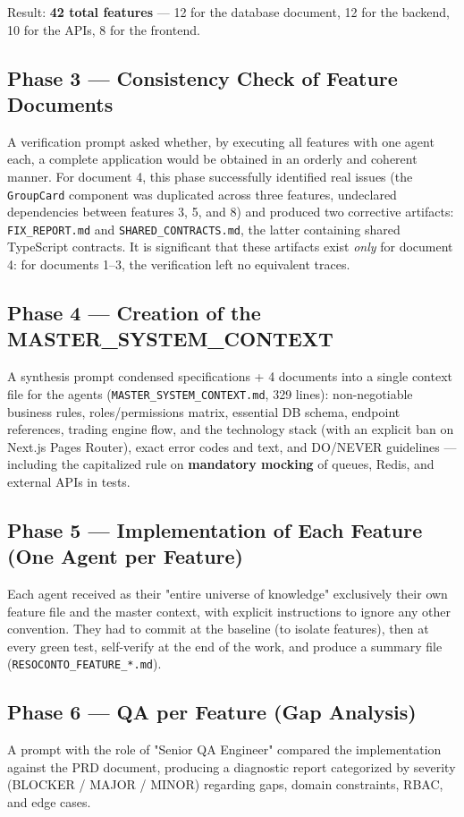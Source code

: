 \documentclass[11pt,a4paper]{article}
\newcommand{\file}[1]{\texttt{\small #1}}
\begin{document}
	Result: \textbf{42 total features} --- 12 for the database document, 12 for the backend, 10 for the APIs, 8 for the frontend.
	
	\subsection{Phase 3 --- Consistency Check of Feature Documents}
	A verification prompt asked whether, by executing all features with one agent each, a complete application would be obtained in an orderly and coherent manner. For document 4, this phase successfully identified real issues (the \file{GroupCard} component was duplicated across three features, undeclared dependencies between features 3, 5, and 8) and produced two corrective artifacts: \file{FIX\_REPORT.md} and \file{SHARED\_CONTRACTS.md}, the latter containing shared TypeScript contracts. It is significant that these artifacts exist \emph{only} for document 4: for documents 1--3, the verification left no equivalent traces.
	
	\subsection{Phase 4 --- Creation of the MASTER\_SYSTEM\_CONTEXT}
	A synthesis prompt condensed specifications + 4 documents into a single context file for the agents (\file{MASTER\_SYSTEM\_CONTEXT.md}, 329 lines): non-negotiable business rules, roles/permissions matrix, essential DB schema, endpoint references, trading engine flow, and the technology stack (with an explicit ban on Next.js Pages Router), exact error codes and text, and DO/NEVER guidelines --- including the capitalized rule on \textbf{mandatory mocking} of queues, Redis, and external APIs in tests.
	
	\subsection{Phase 5 --- Implementation of Each Feature (One Agent per Feature)}
	Each agent received as their "entire universe of knowledge" exclusively their own feature file and the master context, with explicit instructions to ignore any other convention. They had to commit at the baseline (to isolate features), then at every green test, self-verify at the end of the work, and produce a summary file (\file{RESOCONTO\_FEATURE\_*.md}).
	
	\subsection{Phase 6 --- QA per Feature (Gap Analysis)}
	A prompt with the role of "Senior QA Engineer" compared the implementation against the PRD document, producing a diagnostic report categorized by severity (BLOCKER / MAJOR / MINOR) regarding gaps, domain constraints, RBAC, and edge cases.
	
\end{document}
